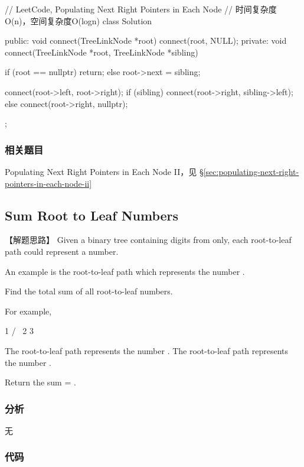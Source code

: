 \begin{Code}
	// LeetCode, Populating Next Right Pointers in Each Node
	// 时间复杂度O(n)，空间复杂度O(logn)
	class Solution {
		public:
		void connect(TreeLinkNode *root) {
			connect(root, NULL);
		}
		private:
		void connect(TreeLinkNode *root, TreeLinkNode *sibling) {
			if (root == nullptr)
			return;
			else
			root->next = sibling;
			
			connect(root->left, root->right);
			if (sibling)
			connect(root->right, sibling->left);
			else
			connect(root->right, nullptr);
		}
	};
\end{Code}


\subsubsection{相关题目}
\begindot
\item Populating Next Right Pointers in Each Node II，见 \S \ref{sec:populating-next-right-pointers-in-each-node-ii}
\myenddot


\subsection{Sum Root to Leaf Numbers} %
\label{sec:sum-root-to-leaf-numbers}


【解题思路】
Given a binary tree containing digits from  only, each root-to-leaf path could represent a number.

An example is the root-to-leaf path  which represents the number .

Find the total sum of all root-to-leaf numbers.

For example,
\begin{Code}
	1
	/ \
	2   3
\end{Code}

The root-to-leaf path  represents the number .
The root-to-leaf path  represents the number .

Return the sum = .


\subsubsection{分析}
无

\subsubsection{代码}

